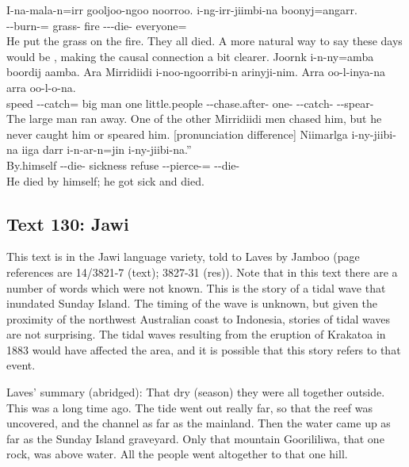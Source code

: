 \begin{exye}
\gll I-na-mala-n=irr gooljoo-ngoo noorroo. i-ng-irr-jiimbi-na boonyj=angarr.\\
--burn-= grass- fire ---die- everyone=\\
\ft He put the grass on the fire. They all died.
\nt A more natural way to say  these days would be , making the causal connection a bit clearer.
\exy {}
\gll Joornk i-n-ny=amba boordij aamba. Ara Mirridiidi i-noo-ngoorribi-n arinyji-nim. Arra oo-l-inya-na arra oo-l-o-na.\\
speed --catch= big man one little.people --chase.after- one-  --catch-  --spear-\\
\ft The large man ran away. One of the other Mirridiidi men chased him, but he never caught him or speared him.
\llg {} [pronunciation difference]
\exy {}
\gll Niimarlga i-ny-jiibi-na iiga darr i-n-ar-n=jin i-ny-jiibi-na.''\\
By.himself --die- sickness refuse --pierce-= --die-\\
\ft He died by himself; he got sick and died.
\end{exye}

\subsection{Text 130: Jawi}
This text is in the Jawi language variety, told to Laves by Jamboo (page references are 14/3821-7 (text); 3827-31 (res)).  Note that in this text there are a number of words which were not known. This is the story of a tidal wave that inundated Sunday Island. The timing of the wave is unknown, but given the proximity of the northwest Australian coast to Indonesia, stories of tidal waves are not surprising. The tidal waves resulting from the eruption of Krakatoa in 1883 would have affected the area, and it is possible that this story refers to that event.

Laves' summary (abridged): That dry (season) they were all together outside. This was a long time ago. The tide went out really far, so that the reef was uncovered, and the channel as far as the mainland. Then the water came up as far as the Sunday Island graveyard. Only that mountain Goorililiwa, that one rock, was above water. All the people went altogether to that one hill.

